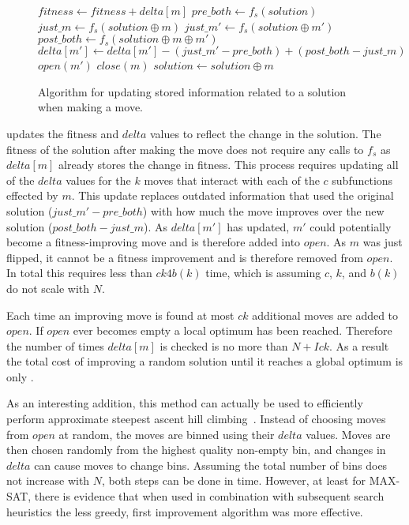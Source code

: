 \begin{figure}
  \begin{algorithmic}[1]
    \State $fitness \leftarrow fitness + delta[m]$
      \State $pre\_both \leftarrow f_s(solution)$
      \State $just\_m \leftarrow f_s(solution \oplus m)$
        \State $just\_m' \leftarrow f_s(solution \oplus m')$
        \State $post\_both \leftarrow f_s(solution \oplus m \oplus m')$
        \State $delta[m'] \leftarrow delta[m'] - (just\_m' - pre\_both) + (post\_both - just\_m)$
        \State $open(m')$
      \EndFor
    \EndFor
    \State $close(m)$
    \State $solution \leftarrow solution \oplus m$
  \EndProcedure
\end{algorithmic}
  \caption{Algorithm for updating stored information related to a solution when
           making a move.}
  \label{fig-make-move}
\end{figure}

 updates the fitness and $delta$ values to reflect the change in the solution. The fitness
of the solution after making the move does not require any calls to $f_s$ as $delta[m]$ already stores the
change in fitness. This process requires updating all of the $delta$ values for the $k$ moves that interact with each of the $c$ subfunctions
effected by $m$. This update replaces outdated information that used the original solution ($just\_m' - pre\_both$)
with how much the move improves over the new solution ($post\_both - just\_m$). As $delta[m']$ has updated, $m'$ could
potentially become a fitness-improving move and is therefore added into $open$. As $m$ was just flipped,
it cannot be a fitness improvement and is therefore removed from $open$.  In total this requires less than
$ck4b(k)$ time, which is  assuming $c$, $k$, and $b(k)$ do not scale with $N$.

Each time an improving move is found at most $ck$ additional moves are added to $open$. If $open$ ever
becomes empty a local optimum has been reached. Therefore the number of times $delta[m]$ is checked
is no more than $N + Ick$. As a result the total cost of improving a random solution until it reaches
a global optimum is only .

As an interesting addition, this method can actually be used to efficiently perform approximate steepest ascent hill
climbing~\cite{whitley:2013:greedy}. Instead of choosing moves from $open$ at random, the moves are binned
using their $delta$ values. Moves are then chosen randomly from the highest quality non-empty bin, and changes
in $delta$ can cause moves to change bins. Assuming the total number of bins does not increase with $N$, both steps
can be done in  time. However, at least for MAX-SAT, there is evidence that when used in combination with subsequent
search heuristics the less greedy, %
first improvement algorithm was more effective.

